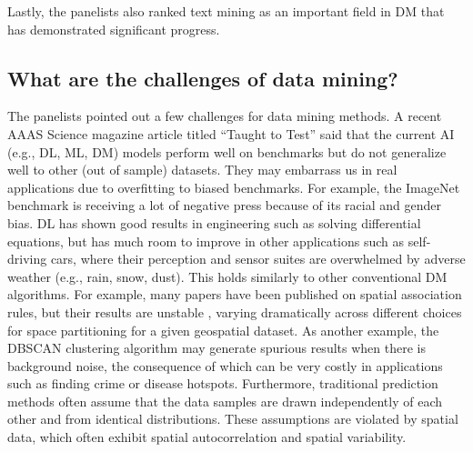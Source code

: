 \documentclass[11pt,dvipdfm]{article}
\begin{document}
Lastly, the panelists also ranked text mining as an important field in DM that has demonstrated significant progress.

\subsection{What are the challenges of data mining?}

The panelists pointed out a few challenges for data mining methods. A recent AAAS Science magazine article titled “Taught to Test” \cite{MHutson2022TaughtToTheTest}
said that the current AI (e.g., DL, ML, DM) models perform well on benchmarks but do not generalize well to other (out of sample) datasets. They may embarrass us in real applications due to overfitting to biased benchmarks. For example, the ImageNet benchmark is receiving a lot of negative press because of its racial and gender bias. DL has shown good results in engineering such as solving differential equations, but has much room to improve in other applications such as self-driving cars, where their perception and sensor suites are overwhelmed by adverse weather (e.g., rain, snow, dust). This holds similarly to other conventional DM algorithms. For example, many papers have been published on spatial association rules, but their results are unstable \cite{EEfteliogluScienceforEarth},
varying dramatically across different choices for space partitioning for a given geospatial dataset. As another example, the DBSCAN clustering algorithm may generate spurious results when there is background noise, the consequence of which can be very costly in applications such as finding crime or disease hotspots. Furthermore, traditional prediction methods often assume that the data samples are drawn independently of each other and from identical distributions. These assumptions are violated by spatial data, which often exhibit spatial autocorrelation and spatial variability. 
\end{document}
